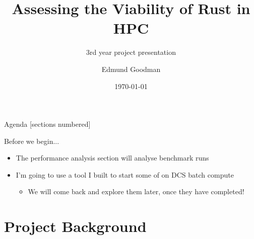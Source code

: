 \documentclass[10pt,aspectratio=169]{beamer}
\title{Assessing the Viability of Rust in HPC}
\subtitle{3rd year project presentation}
\author{Edmund Goodman}
\date{\today}
\begin{document}
\maketitle

\begin{frame}{Agenda}
  [sections numbered]
  \tableofcontents%
\end{frame}

\begin{frame}{Before we begin...}
\begin{itemize}
    \item<1-> The performance analysis section will analyse benchmark runs
    \vspace*{0.5cm}
    \item<2-> I'm going to use a tool I built to start some of on DCS batch compute
    \begin{itemize}
        \item \alert{We will come back and explore them later, once they have completed!}
    \end{itemize}
\end{itemize}
\end{frame}

\section{Project Background}
\end{document}
